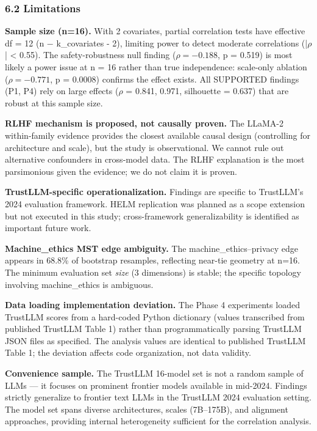 \subsubsection{6.2 Limitations}

\textbf{Sample size (n=16).} With 2 covariates, partial correlation tests have effective df = 12 (n $-$ k\_covariates - 2), limiting power to detect moderate correlations (|$\rho$| < 0.55). The safety-robustness null finding ($\rho = -0.188$, p = 0.519) is most likely a power issue at n = 16 rather than true independence: scale-only ablation ($\rho = -0.771$, p = 0.0008) confirms the effect exists. All SUPPORTED findings (P1, P4) rely on large effects ($\rho$ = 0.841, 0.971, silhouette = 0.637) that are robust at this sample size.

\textbf{RLHF mechanism is proposed, not causally proven.} The LLaMA-2 within-family evidence provides the closest available causal design (controlling for architecture and scale), but the study is observational. We cannot rule out alternative confounders in cross-model data. The RLHF explanation is the most parsimonious given the evidence; we do not claim it is proven.

\textbf{TrustLLM-specific operationalization.} Findings are specific to TrustLLM's 2024 evaluation framework. HELM replication was planned as a scope extension but not executed in this study; cross-framework generalizability is identified as important future work.

\textbf{Machine\_ethics MST edge ambiguity.} The machine\_ethics--privacy edge appears in 68.8\% of bootstrap resamples, reflecting near-tie geometry at n=16. The minimum evaluation set \textit{size} (3 dimensions) is stable; the specific topology involving machine\_ethics is ambiguous.

\textbf{Data loading implementation deviation.} The Phase 4 experiments loaded TrustLLM scores from a hard-coded Python dictionary (values transcribed from published TrustLLM Table 1) rather than programmatically parsing TrustLLM JSON files as specified. The analysis values are identical to published TrustLLM Table 1; the deviation affects code organization, not data validity.

\textbf{Convenience sample.} The TrustLLM 16-model set is not a random sample of LLMs --- it focuses on prominent frontier models available in mid-2024. Findings strictly generalize to frontier text LLMs in the TrustLLM 2024 evaluation setting. The model set spans diverse architectures, scales (7B--175B), and alignment approaches, providing internal heterogeneity sufficient for the correlation analysis.

